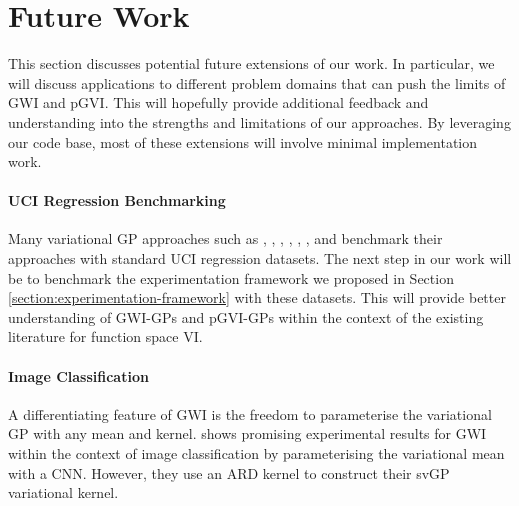 \documentclass{article}
\def\code#1{\texttt{#1}}
\numberwithin{equation}{section}
\begin{document}
\newpage
\section{Future Work}\label{section:future-work}
This section discusses potential future extensions of our work. 
In particular, we will discuss applications to different problem domains that can push the limits of GWI and pGVI. 
This will hopefully provide additional feedback and understanding into the strengths and limitations of our approaches.
By leveraging our code base, most of these extensions will involve minimal implementation work.


\paragraph{UCI Regression Benchmarking} 
Many variational GP approaches such as \cite{wild2022generalized}, \cite{blundell2015weight}, \cite{gal2015dropout}, \cite{li2017dropout}, \cite{ma2021functional}, \cite{ma2019variational}, and \cite{sun2019functional} benchmark their approaches with standard UCI regression datasets. 
The next step in our work will be to benchmark the experimentation framework we proposed in Section \ref{section:experimentation-framework} with these datasets.
This will provide better understanding of GWI-GPs and pGVI-GPs within the context of the existing literature for function space VI.


\paragraph{Image Classification} 
A differentiating feature of GWI is the freedom to parameterise the variational GP with any mean and kernel. 
\cite{wild2022generalized} shows promising experimental results for GWI within the context of image classification by parameterising the variational mean with a CNN.
However, they use an ARD kernel to construct their svGP variational kernel.
\end{document}
